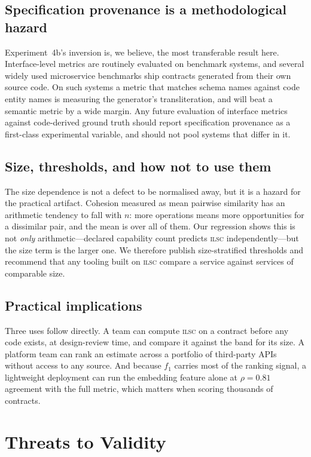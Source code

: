 \documentclass[journal]{IEEEtran}
\newcommand{\ilsc}{\textsc{ilsc}}
\begin{document}
\subsection{Specification provenance is a methodological hazard}
Experiment~4b's inversion is, we believe, the most transferable result here.
Interface-level metrics are routinely evaluated on benchmark systems, and
several widely used microservice benchmarks ship contracts generated from their
own source code. On such systems a metric that matches schema names against code
entity names is measuring the generator's transliteration, and will beat a
semantic metric by a wide margin. Any future evaluation of interface metrics
against code-derived ground truth should report specification provenance as a
first-class experimental variable, and should not pool systems that differ in
it.

\subsection{Size, thresholds, and how not to use them}
The size dependence is not a defect to be normalised away, but it is a hazard for
the practical artifact. Cohesion measured as mean pairwise similarity has an
arithmetic tendency to fall with $n$: more operations means more opportunities
for a dissimilar pair, and the mean is over all of them. Our regression shows
this is not \emph{only} arithmetic---declared capability count predicts \ilsc{}
independently---but the size term is the larger one. We therefore publish
size-stratified thresholds and recommend that any tooling built on \ilsc{}
compare a service against services of comparable size.

\subsection{Practical implications}
Three uses follow directly. A team can compute \ilsc{} on a contract before any
code exists, at design-review time, and compare it against the band for its
size. A platform team can rank an estimate across a portfolio of third-party
APIs without access to any source. And because $f_1$ carries most of the ranking
signal, a lightweight deployment can run the embedding feature alone at
$\rho = 0.81$ agreement with the full metric, which matters when scoring
thousands of contracts.

\section{Threats to Validity}
\label{sec:threats}
\end{document}
